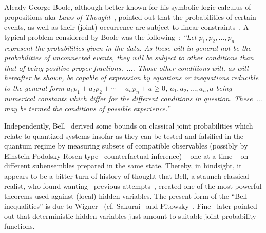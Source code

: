\documentclass[%
  twocolumn,
 showpacs,
 showkeys,
 preprintnumbers,
 amsmath,amssymb,
 aps,
  pra,
  longbibliography,
 floatfix,
 ]{revtex4-1}
\begin{document}
Aleady George Boole, although better known for his symbolic logic calculus of propositions aka {\em Laws of Thought}~\cite{Boole},
pointed out that the  probabilities of certain events,
as well as their (joint) occurrence  are subject to linear
constraints~\cite{Boole,Boole-62,Frechet1935,Hailperin-1965,Hailperin-86,Ursic1984,Ursic:1986:GFL:3023712.3023752,Ursic1988,Beltrametti-1991,Pykacz-1991,Pulmannova-1992,Beltrametti-1993,Beltrametti-1994,DvurLaen-1994,Beltrametti1995,Beltrametti-1995,Noce-1995,Laenger1995,DvurLaen-1995,DvurLaen-1995b,Beltrametti-1996,Pulmannova-2002}.
A typical problem considered by Boole was the following~\cite[p.~229]{Boole-62}:
{\em ``Let $p_1, p_2,\ldots , p_n$ represent the probabilities given in the data. As
these will in general not be the probabilities of unconnected events, they will be subject
to other conditions than that of being positive proper fractions,~$\ldots$.
Those other conditions will, as will hereafter be shown, be capable of expression by
equations or inequations reducible to the general form
$a_1 p_1 + a_2p_2 + \cdots + a_n p_n +a \ge 0$,
$a_1, a_2, \ldots , a_n, a$ being numerical constants which differ for the different conditions in
question. These~$\ldots$ may be termed the conditions of possible
experience.''}

Independently,
Bell~\cite{bell} derived some bounds on classical joint probabilities
which relate to quantized systems insofar as they can be tested and falsified in the quantum regime by measuring subsets
of compatible observables
(possibly by Einstein-Podolsky-Rosen type~\cite{epr} counterfactual inference) -- one at a time --
on different subensembles
prepared in the same state.
Thereby, in hindsight, it appears to be a bitter turn of history of thought that Bell, a staunch classical realist, who
found wanting~\cite{bell-66} previous attempts~\cite{v-neumann-49,v-neumann-55},
created one of the most powerful theorems used against (local) hidden variables.
The present form of the ``Bell inequalities'' is due to Wigner~\cite{wigner-70} (cf. Sakurai~\cite[p.~241-243]{Sakurai-1994} and  Pitowsky~\cite[Footnote~13]{pitowsky-89a}.
Fine~\cite{Fine-82} later pointed out that deterministic hidden variables
just amount to suitable joint probability functions.
\end{document}
